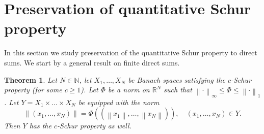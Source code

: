\documentclass{amsart}
\numberwithin{equation}{section}
\newtheorem{thm}{Theorem}[section]
\theoremstyle{definition}
\def\en{\mathbb N}
\def\er{\mathbb R}
\newcommand{\norm}[1]{\left\|#1\right\|}
\begin{document}
\section{Preservation of quantitative Schur property}\label{sec:preserving}

In this section we study preservation of the quantitative Schur property to direct sums. We start by a general result on finite direct sums.

\begin{thm}\label{T:konecne}
    Let $N\in\en$, let $X_1,\dots,X_N$ be Banach spaces satisfying the $c$-Schur property (for some $c\ge1$).
    Let $\Phi$ be a norm on $\er^N$ such that $\norm{\cdot}_\infty\le \Phi\le\norm{\cdot}_1$. 
    Let $Y=X_1\times\dots\times X_N$ be equipped with the norm
    $$\norm{(x_1,\dots,x_N)}=\Phi((\norm{x_1},\dots,\norm{x_N})),\quad (x_1,\dots,x_N)\in Y.$$
    Then $Y$ has the $c$-Schur property as well.
\end{thm}
\end{document}
